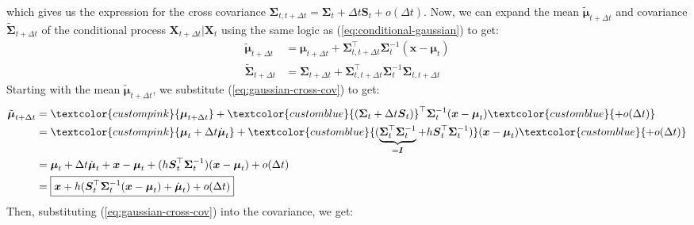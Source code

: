 \documentclass{article}
\newcommand{\bluetext}[1]{\textcolor{customblue}{#1}}
\newcommand{\pinktext}[1]{\textcolor{custompink}{#1}}
\begin{document}
which gives us the expression for the cross covariance $\boldsymbol{\Sigma}_{t, t+\Delta t}=\boldsymbol{\Sigma}_t+\Delta t\boldsymbol{S}_t+o(\Delta t)$. Now, we can expand the mean $\tilde{\boldsymbol{\mu}}_{t+\Delta t}$ and covariance $\tilde{\boldsymbol{\Sigma}}_{t+\Delta t}$ of the conditional process $\boldsymbol{X}_{t+\Delta t}|\boldsymbol{X}_t$ using the same logic as (\ref{eq:conditional-gaussian}) to get:
\begin{align}
    \tilde{\boldsymbol{\mu}}_{t+\Delta t}&=\boldsymbol{\mu}_{t+\Delta t}+\boldsymbol{\Sigma}^{\top}_{t, t+\Delta t}\boldsymbol{\Sigma}_t^{-1}(\boldsymbol{x}-\boldsymbol{\mu}_t)\\
    \tilde{\boldsymbol{\Sigma}}_{t+\Delta t}&=\boldsymbol{\Sigma}_{t+\Delta t}+\boldsymbol{\Sigma}^{\top}_{t, t+\Delta t}\boldsymbol{\Sigma}_t^{-1}\boldsymbol{\Sigma}_{t, t+\Delta t}
\end{align}
Starting with the mean $\tilde{\boldsymbol{\mu}}_{t+\Delta t}$, we substitute (\ref{eq:gaussian-cross-cov}) to get:
\begin{align}
    \tilde{\boldsymbol{\mu}}_{t+\Delta t}&=\pinktext{\boldsymbol{\mu}_{t+\Delta t}}+\bluetext{(\boldsymbol{\Sigma}_t+\Delta t\boldsymbol{S}_t)}^{\top}\boldsymbol{\Sigma}_t^{-1}(\boldsymbol{x}-\boldsymbol{\mu}_t)\bluetext{+o(\Delta t)}\nonumber\\
    &=\pinktext{\boldsymbol{\mu}_t+\Delta t\dot{\boldsymbol{\mu}}_t}+\bluetext{(\underbrace{\boldsymbol{\Sigma}_t^\top\boldsymbol{\Sigma}_t^{-1}}_{=\boldsymbol{I}}+h\boldsymbol{S}_t^{\top}\boldsymbol{\Sigma}_t^{-1})}(\boldsymbol{x}-\boldsymbol{\mu}_t)\bluetext{+o(\Delta t)}\nonumber\\
    &=\boldsymbol{\mu}_t+\Delta t\dot{\boldsymbol{\mu}}_t+\boldsymbol{x}-\boldsymbol{\mu}_t+(h\boldsymbol{S}_t^{\top}\boldsymbol{\Sigma}_t^{-1})(\boldsymbol{x}-\boldsymbol{\mu}_t)+o(\Delta t)\nonumber\\
    &=\boxed{\boldsymbol{x}+h(\boldsymbol{S}_t^{\top}\boldsymbol{\Sigma}_t^{-1}(\boldsymbol{x}-\boldsymbol{\mu}_t)+\dot{\boldsymbol{\mu}}_t)+o(\Delta t)}\label{eq:gaussian-increment-mean}
\end{align}
Then, substituting (\ref{eq:gaussian-cross-cov}) into the covariance, we get:
\end{document}
